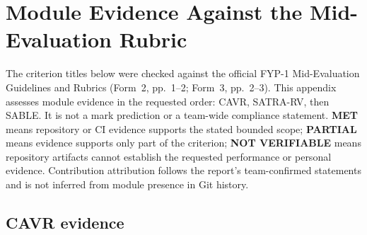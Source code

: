 \chapter{Module Evidence Against the Mid-Evaluation Rubric}
\label{app:module-rubric}
The criterion titles below were checked against the official FYP-1 Mid-Evaluation Guidelines and Rubrics (Form~2, pp.~1--2; Form~3, pp.~2--3). This appendix assesses module evidence in the requested order: CAVR, SATRA-RV, then SABLE. It is not a mark prediction or a team-wide compliance statement. \textbf{MET} means repository or CI evidence supports the stated bounded scope; \textbf{PARTIAL} means evidence supports only part of the criterion; \textbf{NOT VERIFIABLE} means repository artifacts cannot establish the requested performance or personal evidence. Contribution attribution follows the report's team-confirmed statements and is not inferred from module presence in Git history.

\setlength{\tabcolsep}{3pt}

\section{CAVR evidence}
